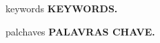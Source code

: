 \renewcommand\subsubsection{\@startsection{subsubsection}{2}{\z@}%
                       {-3\p@ \@plus -4\p@ \@minus -4\p@}%
                       {0\p@ \@plus 4\p@ \@minus 4\p@}%
                       {\normalfont\XIPT\bfseries\boldmath
                        \rightskip=\z@ \@plus 8em\pretolerance=10000 }}

\RequirePackage{titlesec}


\pagestyle{empty}

\newcommand{\authortag}[1]{$^{#1}$}

\def\address#1{\gdef\@address{#1}}

\def\@maketitle{\newpage
 \begin{center}
  {\XIIIPT\bf\@title\par}
   \end{center}\par
}
\let\maketitleOLD\maketitle
\renewcommand{\maketitle}{\maketitleOLD\thispagestyle{empty}}

\renewenvironment{abstract}{
  \begin{center}
  \noindent {\XIPT \bfseries  ABSTRACT}
  \end{center}
    \vspace*{-12pt}
    \hspace*{\parindent}
}

\newenvironment{keywords}{
    \noindent  \bfseries KEYWORDS.
}

\newenvironment{resumo}{
    \begin{center}
    \XIPT\bfseries RESUMO
    \end{center}
    \vspace*{-12pt}
    \hspace*{\parindent}
}

\newenvironment{palchaves}{
    \noindent\bfseries PALAVRAS CHAVE.
}

